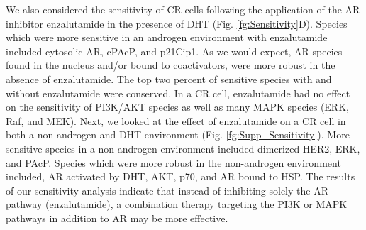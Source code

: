 \documentclass[12pt]{article}
\begin{document}
We also considered the sensitivity of CR cells following the application of the AR inhibitor enzalutamide in the presence of DHT (Fig. \ref{fg:Sensitivity}D). 
Species which were more sensitive in an androgen environment with enzalutamide included cytosolic AR, cPAcP, and p21Cip1. 
As we would expect, AR species found in the nucleus and/or bound to coactivators, were more robust in the absence of enzalutamide. 
The top two percent of sensitive species with and without enzalutamide were conserved. 
In a CR cell, enzalutamide had no effect on the sensitivity of PI3K/AKT species as well as many MAPK species (ERK, Raf, and MEK). 
Next, we looked at the effect of enzalutamide on a CR cell in both a non-androgen and DHT environment (Fig. \ref{fg:Supp_Sensitivity}). 
More sensitive species in a non-androgen environment included dimerized HER2, ERK, and PAcP. 
Species which were more robust in the non-androgen environment included, AR activated by DHT, AKT, p70, and AR bound to HSP.
The results of our sensitivity analysis indicate that instead of inhibiting solely the AR pathway (enzalutamide), a combination therapy targeting the PI3K or MAPK pathways in addition to AR may be more effective.

  
\end{document}
